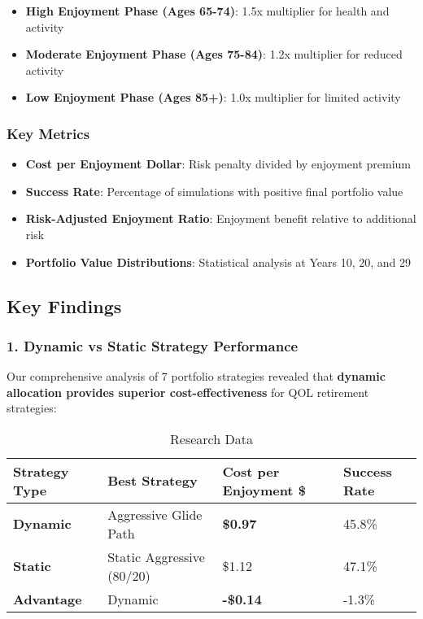 \documentclass[11pt,letterpaper]{article}
\begin{document}
\begin{itemize}
\item \textbf{High Enjoyment Phase (Ages 65-74)}: 1.5x multiplier for health and activity
\item \textbf{Moderate Enjoyment Phase (Ages 75-84)}: 1.2x multiplier for reduced activity
\item \textbf{Low Enjoyment Phase (Ages 85+)}: 1.0x multiplier for limited activity
\end{itemize}

\subsubsection{Key Metrics}
\begin{itemize}
\item \textbf{Cost per Enjoyment Dollar}: Risk penalty divided by enjoyment premium
\item \textbf{Success Rate}: Percentage of simulations with positive final portfolio value
\item \textbf{Risk-Adjusted Enjoyment Ratio}: Enjoyment benefit relative to additional risk
\item \textbf{Portfolio Value Distributions}: Statistical analysis at Years 10, 20, and 29
\end{itemize}



\subsection{Key Findings}

\subsubsection{1. Dynamic vs Static Strategy Performance}

Our comprehensive analysis of 7 portfolio strategies revealed that \textbf{dynamic allocation provides superior cost-effectiveness} for QOL retirement strategies:



\begin{table}[H]
\centering
\begin{tabular}{@{}llll@{}}
\toprule
\textbf{Strategy Type} & \textbf{Best Strategy} & \textbf{Cost per Enjoyment \$} & \textbf{Success Rate} \\
\midrule
\textbf{Dynamic} & Aggressive Glide Path & \textbf{\$0.97} & 45.8\% \\
\textbf{Static} & Static Aggressive (80/20) & \$1.12 & 47.1\% \\
\textbf{Advantage} & Dynamic & \textbf{-\$0.14} & -1.3\% \\
\bottomrule
\end{tabular}
\caption{Research Data}
\end{table}
\end{document}
